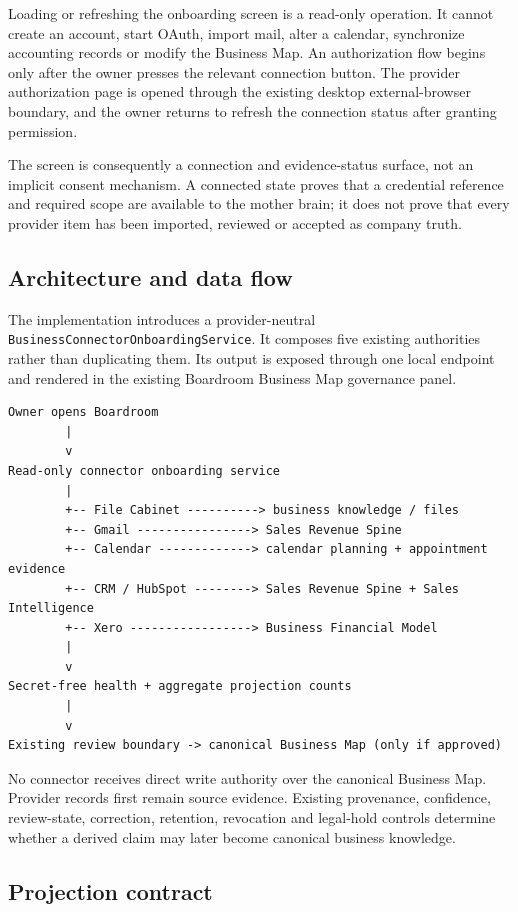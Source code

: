 Loading or refreshing the onboarding screen is a read-only operation.  It cannot
create an account, start OAuth, import mail, alter a calendar, synchronize accounting
records or modify the Business Map.  An authorization flow begins only after the
owner presses the relevant connection button.  The provider authorization page is
opened through the existing desktop external-browser boundary, and the owner returns
to refresh the connection status after granting permission.

The screen is consequently a connection and evidence-status surface, not an implicit
consent mechanism.  A connected state proves that a credential reference and required
scope are available to the mother brain; it does not prove that every provider item
has been imported, reviewed or accepted as company truth.

\subsection{Architecture and data flow}

The implementation introduces a provider-neutral
\texttt{BusinessConnectorOnboardingService}.  It composes five existing authorities
rather than duplicating them.  Its output is exposed through one local endpoint and
rendered in the existing Boardroom Business Map governance panel.

\begin{verbatim}
Owner opens Boardroom
        |
        v
Read-only connector onboarding service
        |
        +-- File Cabinet ----------> business knowledge / files
        +-- Gmail ----------------> Sales Revenue Spine
        +-- Calendar -------------> calendar planning + appointment evidence
        +-- CRM / HubSpot --------> Sales Revenue Spine + Sales Intelligence
        +-- Xero -----------------> Business Financial Model
        |
        v
Secret-free health + aggregate projection counts
        |
        v
Existing review boundary -> canonical Business Map (only if approved)
\end{verbatim}

No connector receives direct write authority over the canonical Business Map.
Provider records first remain source evidence.  Existing provenance, confidence,
review-state, correction, retention, revocation and legal-hold controls determine
whether a derived claim may later become canonical business knowledge.

\subsection{Projection contract}

